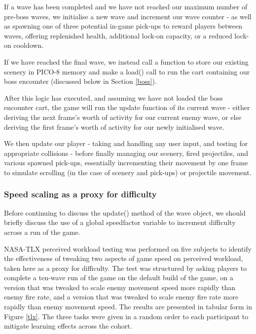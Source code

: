 \documentclass[11pt]{article}
\begin{document}
If a wave has been completed and we have not reached our maximum number of pre-boss waves,
we initialise a new wave and increment our wave counter - as well as spawning one of three
potential in-game pick-ups to reward players between waves, offering replenished health,
additional lock-on capacity, or a reduced lock-on cooldown.

If we have reached the final wave, we instead call a function to store our existing scenery
in PICO-8 memory and make a load() call to run the cart containing our boss encounter (discussed
below in Section \ref{boss}).

After this logic has executed, and assuming we have not loaded the boss encounter
cart, the game will run the update function of its current wave - either deriving
the next frame's worth of activity for our current enemy wave, or else deriving the
first frame's worth of activity for our newly initialised wave.

We then update our player - taking and handling any user input, and testing for
appropriate collisions - before finally managing our scenery, fired projectiles,
and various spawned pick-ups, essentially incrementing their movement by one frame to
simulate scrolling (in the case of scenery and pick-ups) or projectile movement.

\subsubsection*{Speed scaling as a proxy for difficulty}

Before continuing to discuss the update() method of the wave object, we should briefly discuss the use of
a global speed\textunderscore factor variable to increment difficulty across a run of the game.

NASA-TLX perceived workload testing\cite{nasa} was performed on five subjects to identify the effectiveness of
tweaking two aspects of game speed on perceived workload, taken here as a proxy for difficulty. The test
was structured by asking players to complete a ten-wave run of the game on the default build of the game, on
a version that was tweaked to scale enemy movement speed more rapidly than enemy fire rate, and a version that
was tweaked to scale enemy fire rate more rapidly than enemy movement speed. The results are presented in tabular
form in Figure \ref{tlx}. The three tasks were given in a random order to each participant to mitigate learning
effects across the cohort.
\end{document}
